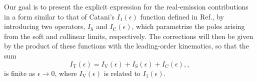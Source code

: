 \documentclass[a4paper, 12pt]{book}
\begin{document}
%
%

Our goal is to present the explicit expression for the real-emission contributions in a form similar to that of Catani's $I_1(\epsilon)$ function defined in Ref.\cite{Catani:1998bh}, by introducing two operators, $I_{\mathrm{S}}$ and $I_{\mathrm{C}}(\epsilon)$, which parametrize the poles arising from the soft and collinear limits, respectively. The corrections will then be given by the product of these functions with the leading-order kinematics, so that the sum
\begin{equation}
I_{\mathrm{T}}(\epsilon) = I_{\mathrm{V}}(\epsilon) + I_{\mathrm{S}} (\epsilon)+ I_{\mathrm{C}}(\epsilon) , ,
\end{equation}
is finite as $\epsilon \to 0$, where $I_{\mathrm{V}}(\epsilon)$ is related to $I_1(\epsilon)$.
  
\end{document}
